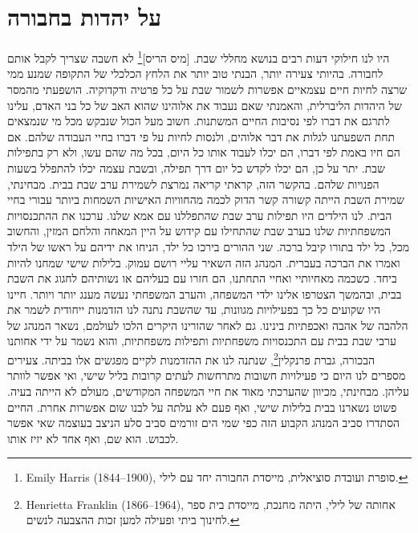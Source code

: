 \documentclass[14pt, article, extrafontsizes, twopage, a4paper]{memoir}
\begin{document}
\chapter{על יהדות בחבורה}
{\larger

היו לנו חילוקי דעות רבים בנושא מחללי שבת. [מיס הריס]\footnote{\textenglish{Emily Harris (1844–1900)}, סופרת ועובדת סוציאלית, מייסדת החבורה יחד עם לילי.} לא חשבה שצריך לקבל אותם לחבורה. בהיותי צעירה יותר, הבנתי טוב יותר את הלחץ הכלכלי של התקופה שמנע ממי שרצה לחיות חיים עצמאיים אפשרות לשמור שבת על כל פרטיה ודקדוקיה. הושפעתי מהמסר של היהדות הליברלית, והאמנתי שאם נעבוד את אלוהינו שהוא האב של כל בני האדם, עלינו לתרגם את דברו לפי נסיבות החיים המשתנות. חשוב מעל הכול שנבקש מכל מי שנמצאים תחת השפעתנו לגלות את דבר אלוהים, ולנסות לחיות על פי דברו בחיי העבודה שלהם. אם הם חיו באמת לפי דברו, הם יכלו לעבוד אותו כל היום, בכל מה שהם עשו, ולא רק בתפילות שבת. יתר על כן, הם יכלו לקדש כל יום דרך תפילה, ובשבת עצמה יכלו להתפלל בשעות הפנויות שלהם. בהקשר הזה, קראתי קריאה נמרצת לשמירת ערב שבת בבית. מבחינתי, שמירת השבת הייתה קשורה קשר הדוק לכמה מהחוויות האישיות השמחות ביותר עבורי בחיי הבית. לנו הילדים היו תפילות ערב שבת שהתפללנו עם אמא שלנו. ערכנו את ההתכנסויות המשפחתיות שלנו בערב שבת שהתחילו עם קידוש על היין המאחה והלחם המזין, והחשוב מכל, כל ילד בתורו קיבל ברכה. שני ההורים בירכו כל ילד, הניחו את ידיהם על ראשו של הילד ואמרו את הברכה בעברית. המנהג הזה השאיר עליי רושם עמוק. בלילות שישי שמחנו להיות ביחד. כשכמה מאחיותיי ואחיי התחתנו, הם חזרו עם בעליהם או נשותיהם לחגוג את השבת בבית, ובהמשך הצטרפו אלינו ילדי המשפחה, והערב המשפחתי נעשה מענג יותר ויותר. חיינו היו שקועים כל כך בפעילויות מגוונות, עד שהשבת נתנה לנו הזדמנות ייחודית לשמר את הלהבה של אהבה ואכפתיות בינינו. גם לאחר שהורינו היקרים הלכו לעולמם, נשאר המנהג של ערבי שבת בבית עם התכנסויות משפחתיות ותפילות משפחתיות, והוא נשמר על ידי אחותנו הבכורה, גברת פרנקלין\footnote{\textenglish{Henrietta Franklin} (1866–1964), אחותה של לילי, היתה מחנכת, מייסדת בית ספר לחינוך ביתי ופעילה למען זכות ההצבעה לנשים.}, שנתנה לנו את ההזדמנות לקיים מפגשים אלו בביתה. צעירים מספרים לנו היום כי פעילויות חשובות מתרחשות לעתים קרובות בליל שישי, ואי אפשר לוותר עליהן. מבחינתי, מכיוון שהערכתי מאוד את חיי המשפחה המקודשים, מעולם לא הייתה בעיה. פשוט נשארנו בבית בלילות שישי, ואף פעם לא עלתה על לבנו שום אפשרות אחרת. החיים הסתדרו סביב המנהג הקבוע הזה כפי שמי הים זורמים סביב סלע הניצב בעוצמה שאי אפשר לכבוש. הוא שם, ואף אחד לא יזיז אותו.

}
\end{document}
